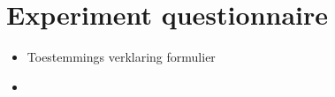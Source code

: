 \chapter{Experiment questionnaire}
\label{app:experiment-forms}
\begin{itemize}
	\item Toestemmings verklaring formulier
	\item

\end{itemize}
